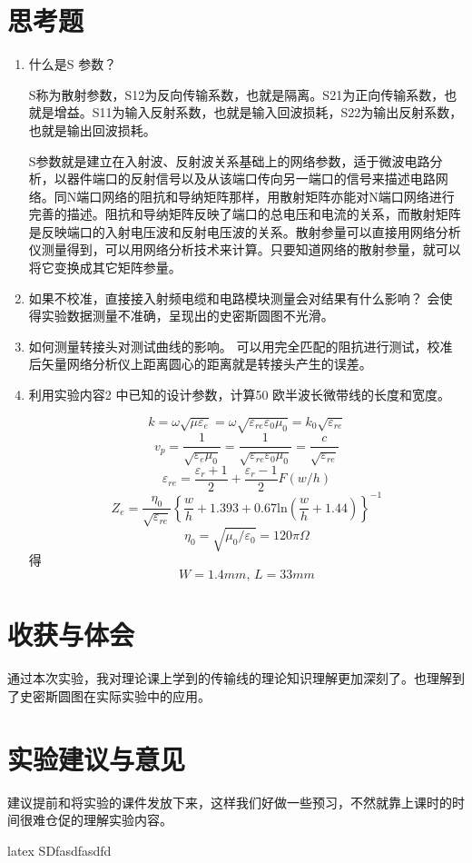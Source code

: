 \documentclass{../source/Experiment}
\begin{document}
\section{思考题}
\begin{enumerate}
    \item 什么是S 参数？

          S称为散射参数，S12为反向传输系数，也就是隔离。S21为正向传输系数，也就是增益。S11为输入反射系数，也就是输入回波损耗，S22为输出反射系数，也就是输出回波损耗。

          S参数就是建立在入射波、反射波关系基础上的网络参数，适于微波电路分析，以器件端口的反射信号以及从该端口传向另一端口的信号来描述电路网络。同N端口网络的阻抗和导纳矩阵那样，用散射矩阵亦能对N端口网络进行完善的描述。阻抗和导纳矩阵反映了端口的总电压和电流的关系，而散射矩阵是反映端口的入射电压波和反射电压波的关系。散射参量可以直接用网络分析仪测量得到，可以用网络分析技术来计算。只要知道网络的散射参量，就可以将它变换成其它矩阵参量。
    \item 如果不校准，直接接入射频电缆和电路模块测量会对结果有什么影响？
          会使得实验数据测量不准确，呈现出的史密斯圆图不光滑。
    \item 如何测量转接头对测试曲线的影响。
          可以用完全匹配的阻抗进行测试，校准后矢量网络分析仪上距离圆心的距离就是转接头产生的误差。
    \item 利用实验内容2 中已知的设计参数，计算50 欧半波长微带线的长度和宽度。

          $$k = \omega \sqrt{\mu \varepsilon _e} = \omega \sqrt{\varepsilon _{re}\varepsilon _0\mu _0} = k_0\sqrt{\varepsilon _{re}}$$
          $$v_p = \frac{1}{\sqrt{\varepsilon _e\mu _0}} = \frac{1}{\sqrt{\varepsilon _{re}\varepsilon _0\mu _0}} = \frac{c}{\sqrt{\varepsilon _{re}}}$$
          $$\varepsilon _{re} = \frac{\varepsilon _r + 1}{2} + \frac{\varepsilon _r-1}{2}F(w/h)$$
          $$Z_e = \frac{\eta _0}{\sqrt{\varepsilon _{re}}}\left\{{\frac{w}{h}+1.393+0.67\mathrm{ln}(\frac{w}{h}+1.44)}\right\}^{-1}$$
          $$\eta _0 = \sqrt{\mu _0/\varepsilon _0} = 120\pi \Omega $$
          得
          $$W = 1.4mm ,\, L = 33mm$$
\end{enumerate}

\section{收获与体会}
通过本次实验，我对理论课上学到的传输线的理论知识理解更加深刻了。也理解到了史密斯圆图在实际实验中的应用。
\section{实验建议与意见}
建议提前和将实验的课件发放下来，这样我们好做一些预习，不然就靠上课时的时间很难仓促的理解实验内容。

\textsf{latex}  SDfasdfasdfd
\end{document}
